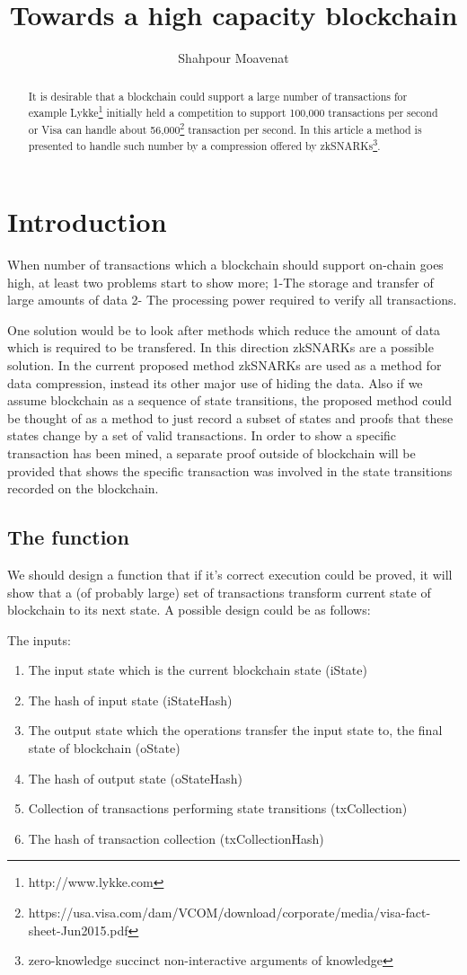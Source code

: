 \documentclass{article}
\title{Towards a high capacity blockchain}
\author{Shahpour Moavenat}
\affil{Lykke Corp}
\begin{document}
	
\maketitle
	
\begin{abstract}
	It is desirable that a blockchain could support a large number of transactions for example Lykke\footnote{http://www.lykke.com} initially held a competition to support 100,000 transactions per second or Visa can handle about 56,000\footnote{https://usa.visa.com/dam/VCOM/download/corporate/media/visa-fact-sheet-Jun2015.pdf} transaction per second.
	In this article a method is presented to handle such number by a compression offered by zkSNARKs\footnote{zero-knowledge succinct non-interactive arguments of knowledge}.
\end{abstract}

\section{Introduction}
When number of transactions which a blockchain should support on-chain goes high, at least two problems start to show more; 1-The storage and transfer of large amounts of data 2- The processing power required to verify all transactions.

One solution would be to look after methods which reduce the amount of data which is required to be transfered. In this direction zkSNARKs are a possible solution. In the current proposed method zkSNARKs are used as a method for data compression, instead its other major use of hiding the data. Also if we assume blockchain as a sequence of state transitions, the proposed method could be thought of as a method to just record a subset of states and proofs that these states change by a set of valid transactions. In order to show a specific transaction has been mined, a separate proof outside of blockchain will be provided that shows the specific transaction was involved in the state transitions recorded on the blockchain.

\subsection{The function}
We should design a function that if it's correct execution could be proved, it will show that a (of probably large) set of transactions transform current state of  blockchain to its next state. A possible design could be as follows:

The inputs:
\begin{enumerate}
\item The input state which is the current blockchain state (iState)
\item The hash of input state (iStateHash)
\item The output state which the operations transfer the input state to, the final state of blockchain (oState)
\item The hash of output state (oStateHash)
\item Collection of transactions performing state transitions (txCollection)
\item The hash of transaction collection (txCollectionHash)
\end{enumerate}
	
\end{document}

